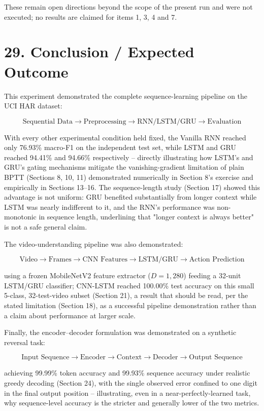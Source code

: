 \documentclass[10pt]{article}
\begin{document}
These remain open directions beyond the scope of the present run and were
not executed; no results are claimed for items 1, 3, 4 and 7.

\section*{29. Conclusion / Expected Outcome}

This experiment demonstrated the complete sequence-learning pipeline on the
UCI HAR dataset:

\[
\boxed{
\text{Sequential Data}
\rightarrow
\text{Preprocessing}
\rightarrow
\text{RNN/LSTM/GRU}
\rightarrow
\text{Evaluation}
}
\]

With every other experimental condition held fixed, the Vanilla RNN reached
only 76.93\% macro-F1 on the independent test set, while LSTM and GRU
reached 94.41\% and 94.66\% respectively -- directly illustrating how LSTM's
and GRU's gating mechanisms mitigate the vanishing-gradient limitation of
plain BPTT (Sections 8, 10, 11) demonstrated numerically in Section 8's
exercise and empirically in Sections 13--16. The sequence-length study
(Section 17) showed this advantage is not uniform: GRU benefited
substantially from longer context while LSTM was nearly indifferent to it,
and the RNN's performance was non-monotonic in sequence length, underlining
that "longer context is always better" is not a safe general claim.

The video-understanding pipeline was also demonstrated:

\[
\boxed{
\text{Video}
\rightarrow
\text{Frames}
\rightarrow
\text{CNN Features}
\rightarrow
\text{LSTM/GRU}
\rightarrow
\text{Action Prediction}
}
\]

using a frozen MobileNetV2 feature extractor ($D=1{,}280$) feeding a
32-unit LSTM/GRU classifier; CNN-LSTM reached 100.00\% test accuracy on this
small 5-class, 32-test-video subset (Section 21), a result that should be
read, per the stated limitation (Section 18), as a successful pipeline
demonstration rather than a claim about performance at larger scale.

Finally, the encoder--decoder formulation was demonstrated on a synthetic
reversal task:

\[
\boxed{
\text{Input Sequence}
\rightarrow
\text{Encoder}
\rightarrow
\text{Context}
\rightarrow
\text{Decoder}
\rightarrow
\text{Output Sequence}
}
\]

achieving 99.99\% token accuracy and 99.93\% sequence accuracy under
realistic greedy decoding (Section 24), with the single observed error
confined to one digit in the final output position -- illustrating, even in
a near-perfectly-learned task, why sequence-level accuracy is the stricter
and generally lower of the two metrics.
\end{document}
